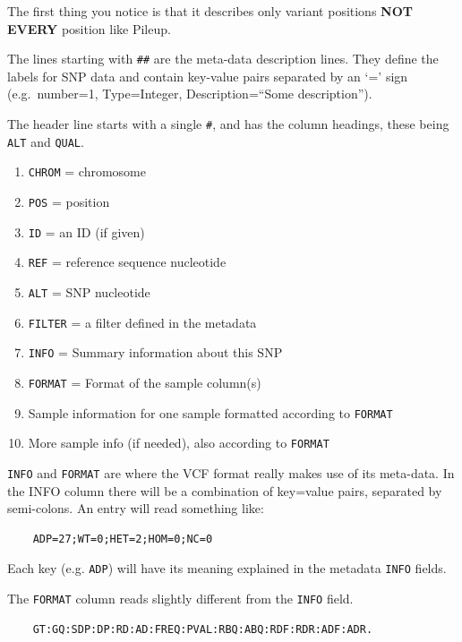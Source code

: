 \documentclass[12pt,]{book}
\providecommand{\tightlist}{%
  \setlength{\itemsep}{0pt}\setlength{\parskip}{0pt}}
\theoremstyle{definition}
\theoremstyle{definition}
\theoremstyle{remark}
\begin{document}
The first thing you notice is that it describes only variant positions
\textbf{NOT} \textbf{EVERY} position like Pileup.

The lines starting with \texttt{\#\#} are the meta-data description
lines. They define the labels for SNP data and contain key-value pairs
separated by an `=' sign (e.g.~number=1, Type=Integer,
Description=``Some description'').

The header line starts with a single \texttt{\#}, and has the column
headings, these being \texttt{ALT} and \texttt{QUAL}.

\begin{enumerate}
\def\labelenumi{\arabic{enumi}.}
\tightlist
\item
  \texttt{CHROM} = chromosome
\item
  \texttt{POS} = position
\item
  \texttt{ID} = an ID (if given)
\item
  \texttt{REF} = reference sequence nucleotide
\item
  \texttt{ALT} = SNP nucleotide
\item
  \texttt{FILTER} = a filter defined in the metadata
\item
  \texttt{INFO} = Summary information about this SNP
\item
  \texttt{FORMAT} = Format of the sample column(s)
\item
  Sample information for one sample formatted according to
  \texttt{FORMAT}
\item
  More sample info (if needed), also according to \texttt{FORMAT}
\end{enumerate}

\texttt{INFO} and \texttt{FORMAT} are where the VCF format really makes
use of its meta-data. In the INFO column there will be a combination of
key=value pairs, separated by semi-colons. An entry will read something
like:

\begin{verbatim}
    ADP=27;WT=0;HET=2;HOM=0;NC=0
\end{verbatim}

Each key (e.g. \texttt{ADP}) will have its meaning explained in the
metadata \texttt{INFO} fields.

The \texttt{FORMAT} column reads slightly different from the
\texttt{INFO} field.

\begin{verbatim}
    GT:GQ:SDP:DP:RD:AD:FREQ:PVAL:RBQ:ABQ:RDF:RDR:ADF:ADR. 
\end{verbatim}
\end{document}
